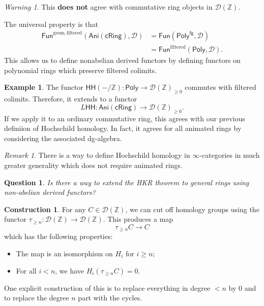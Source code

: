 \documentclass[10pt]{amsart}
\newtheorem{quest}[thm]{Question}
\theoremstyle{definition}
\newtheorem{con}[thm]{Construction}
\newtheorem{exm}[thm]{Example}
\theoremstyle{remark}
\newtheorem{rmk}[thm]{Remark}
\newtheorem{warn}[thm]{Warning}
\theoremstyle{plain}
\theoremstyle{definition}
\theoremstyle{remark}
\newcommand{\Z}{\mathbb{Z}}
\newcommand{\mc}[1]{\mathcal{#1}}
\newcommand{\mr}[1]{\mathrm{#1}}
\newcommand{\ms}[1]{\mathsf{#1}}
\newcommand{\1}{\mathbf{1}}
\newcommand{\2}{\mathbf{2}}
\newcommand{\3}{\mathbf{3}}
\newcommand{\HH}{\ms{HH}}
\begin{document}
\begin{warn}
    This \textbf{does not} agree with commutative ring objects in $\mc{D}(\Z)$.
\end{warn}

The universal property is that
\begin{align*}
    \ms{Fun}^{\mr{geom,filtered}}(\ms{Ani}(\ms{cRing}), \mc{D}) &= \ms{Fun}(\ms{Poly}^{\ms{fg}}, \mc{D}) \\
    &= \ms{Fun}^{\mr{filtered}}(\ms{Poly}, \mc{D}).
\end{align*}
This allows us to define nonabelian derived functors by defining functors on polynomial rings which preserve filtered colimits.

\begin{exm}
    The functor $\HH(-/\Z) \colon \ms{Poly} \to \mc{D}(\Z)_{\geq 0}$ commutes with filtered colimits. Therefore, it extends to a functor
    \[ L\HH \colon \ms{Ani}(\ms{cRing}) \to \mc{D}(\Z)_{\geq 0}. \]
    If we apply it to an ordinary commutative ring, this agrees with our previous definiion of Hochschild homology. In fact, it agrees for all animated rings by considering the associated dg-algebra.
\end{exm}

\begin{rmk}
    There is a way to define Hochschild homology in $\infty$-categories in much greater generality which does not require animated rings.
\end{rmk}

\begin{quest}
    Is there a way to extend the HKR theorem to general rings using non-abelian derived functors?
\end{quest}

\begin{con}
    For any $C \in \mc{D}(\Z)$, we can cut off homology groups using the functor $\tau_{\geq n} \colon \mc{D}(\Z) \to \mc{D}(\Z)$. This produces a map
    \[ \tau_{\geq n} C \to C \]
    which has the following properties:
    \begin{itemize}
        \item The map is an isomorphism on $H_i$ for $i \geq n$;
        \item For all $i < n$, we have $H_i(\tau_{\geq n} C) = 0$.
    \end{itemize}
    One explicit construction of this is to replace everything in degree $<n$ by $0$ and to replace the degree $n$ part with the cycles.
\end{con}
\end{document}
